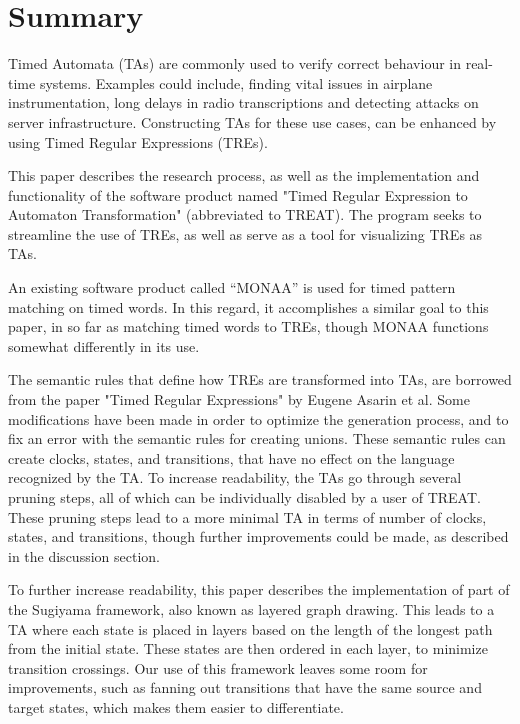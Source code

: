\section*{Summary}
\thispagestyle{empty}

Timed Automata (TAs) are commonly used to verify correct behaviour in real-time systems. Examples could include, finding vital issues in airplane instrumentation, long delays in radio transcriptions and detecting attacks on server infrastructure. Constructing TAs for these use cases, can be enhanced by using Timed Regular Expressions (TREs).

This paper describes the research process, as well as the implementation and functionality of the software product named "Timed Regular Expression to Automaton Transformation" (abbreviated to TREAT).
The program seeks to streamline the use of TREs, as well as serve as a tool for visualizing TREs as TAs.

An existing software product called ``MONAA'' is used for timed pattern matching on timed words. In this regard, it accomplishes a similar goal to this paper, in so far as matching timed words to TREs, though MONAA functions somewhat differently in its use.

The semantic rules that define how TREs are transformed into TAs, are borrowed from the paper "Timed Regular Expressions" by Eugene Asarin et al. Some modifications have been made in order to optimize the generation process, and to fix an error with the semantic rules for creating unions. These semantic rules can create clocks, states, and transitions, that have no effect on the language recognized by the TA. To increase readability, the TAs go through several pruning steps, all of which can be individually disabled by a user of TREAT.
These pruning steps lead to a more minimal TA in terms of number of clocks, states, and transitions, though further improvements could be made, as described in the discussion section.

To further increase readability, this paper describes the implementation of part of the Sugiyama framework, also known as layered graph drawing. This leads to a TA where each state is placed in layers based on the length of the longest path from the initial state. These states are then ordered in each layer, to minimize transition crossings. Our use of this framework leaves some room for improvements, such as fanning out transitions that have the same source and target states, which makes them easier to differentiate.

